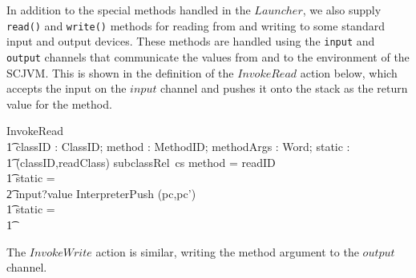 In addition to the special methods handled in the $Launcher$, we also
supply \texttt{read()} and \texttt{write()} methods for reading from
and writing to some standard input and output devices. 
These methods are handled using the \texttt{input} and \texttt{output}
channels that communicate the values from and to the environment of
the SCJVM.
This is shown in the definition of the $InvokeRead$ action below,
which accepts the input on the $input$ channel and pushes it onto the
stack as the return value for the method.
\begin{circusaction}
  InvokeRead \circdef \\
  \t1 \circval classID : ClassID; \circval method : MethodID; \circval methodArgs : \seq Word; \circval static : \boolean \circspot \\
  \t1 \lcircguard (classID,readClass) \in subclassRel~cs \land method = readID \rcircguard \circguard {} \\
  \t1 \circif static = \true \circthen {} \\
  \t2 input?value \then \lschexpract InterpreterPush \hide (pc,pc') \rschexpract \\
  \t1 {} \circelse static = \false \circthen \Chaos \\
  \t1 \circfi
\end{circusaction}
The $InvokeWrite$ action is similar, writing the method argument to
the $output$ channel.

